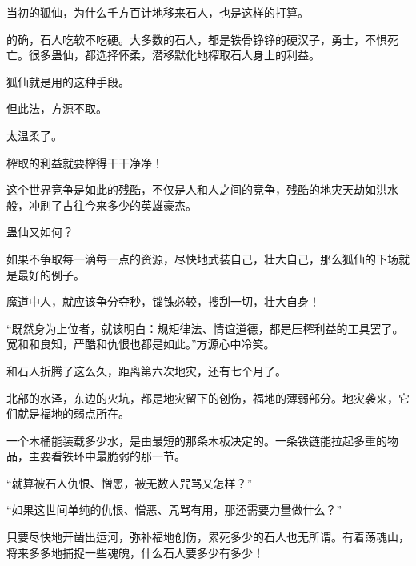 \begin{this_body}
当初的狐仙，为什么千方百计地移来石人，也是这样的打算。

的确，石人吃软不吃硬。大多数的石人，都是铁骨铮铮的硬汉子，勇士，不惧死亡。很多蛊仙，都选择怀柔，潜移默化地榨取石人身上的利益。

狐仙就是用的这种手段。

但此法，方源不取。

太温柔了。

榨取的利益就要榨得干干净净！

这个世界竞争是如此的残酷，不仅是人和人之间的竞争，残酷的地灾天劫如洪水般，冲刷了古往今来多少的英雄豪杰。

蛊仙又如何？

如果不争取每一滴每一点的资源，尽快地武装自己，壮大自己，那么狐仙的下场就是最好的例子。

魔道中人，就应该争分夺秒，锱铢必较，搜刮一切，壮大自身！

“既然身为上位者，就该明白：规矩律法、情谊道德，都是压榨利益的工具罢了。宽和和良知，严酷和仇恨也都是如此。”方源心中冷笑。

和石人折腾了这么久，距离第六次地灾，还有七个月了。

北部的水泽，东边的火坑，都是地灾留下的创伤，福地的薄弱部分。地灾袭来，它们就是福地的弱点所在。

一个木桶能装载多少水，是由最短的那条木板决定的。一条铁链能拉起多重的物品，主要看铁环中最脆弱的那一节。

“就算被石人仇恨、憎恶，被无数人咒骂又怎样？”

“如果这世间单纯的仇恨、憎恶、咒骂有用，那还需要力量做什么？”

只要尽快地开凿出运河，弥补福地创伤，累死多少的石人也无所谓。有着荡魂山，将来多多地捕捉一些魂魄，什么石人要多少有多少！

\end{this_body}


